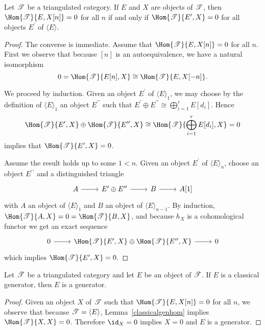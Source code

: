 \documentclass[10pt]{amsart}
\begin{document}
\begin{lem}\label{classicalgenhom}
  Let $\mathscr{T}$ be a triangulated category.
  If $E$ and $X$ are objects of $\mathscr{T}$, then $\Hom{\T}{E,X[n]} = 0$ for all $n$ if and only if $\Hom{\T}{E^\prime, X} = 0$ for all objects $E^\prime$ of $\langle E \rangle$.
  
  \begin{proof}
    The converse is immediate.
    Assume that $\Hom{\T}{E,X[n]} = 0$ for all $n$.
    First we observe that because $[n]$ is an autoequivalence, we have a natural isomorphism
    $$0 = \Hom{\T}{E[n], X} \cong \Hom{\T}{E, X[-n]}.$$
    
    We proceed by induction.
    Given an object $E^\prime$ of $\langle E \rangle_1$, we may choose by the definition of $\langle E \rangle_1$ an object  $E^{\prime\prime}$ such that $E^\prime \oplus E^{\prime\prime} \cong \bigoplus_{i = 1}^r E[d_i]$.
    Hence
    $$\Hom{\T}{E^\prime,X} \oplus \Hom{\T}{E^{\prime\prime}, X} \cong \Hom{\T}{\bigoplus_{i=1}^rE[d_i], X} = 0$$
    implies that $\Hom{\T}{E^\prime, X} = 0$.
    
    Assume the result holds up to some $1 < n$.
    Given an object $E^\prime$ of $\langle E \rangle_n$, choose an object $E^{\prime\prime}$ and a distinguished triangle
    $$\begin{tikzcd}
      A \arrow{r} & E^\prime \oplus E^{\prime\prime} \arrow{r} & B \arrow{r} & A[1]
    \end{tikzcd}$$
    with $A$ an object of $\langle E \rangle_1$ and $B$ an object of $\langle E \rangle_{n-1}$.
    By induction, $\Hom{\T}{A,X} = 0 = \Hom{\T}{B,X}$, and because $h_X$ is a cohomological functor we get an exact sequence
    $$\begin{tikzcd}
      0 \arrow{r} & \Hom{\T}{E^\prime,X} \oplus \Hom{\T}{E^{\prime\prime}, X} \arrow{r} & 0
    \end{tikzcd}$$
    which implies $\Hom{\T}{E^\prime,X} = 0$.
  \end{proof}
\end{lem}

\begin{lem}\label{classicalgenisgen}
  Let $\mathscr{T}$ be a triangulated category and let $E$ be an object of $\mathscr{T}$.
  If $E$ is a classical generator, then $E$ is a generator.
  
  \begin{proof}
    Given an object $X$ of $\mathscr{T}$ such that $\Hom{\T}{E,X[n]} = 0$ for all $n$, we observe that because $\mathscr{T} = \langle E \rangle$, Lemma~\ref{classicalgenhom} implies $\Hom{\T}{X,X} = 0$.
    Therefore $\id_{X} = 0$ implies $X = 0$ and $E$ is a generator.
  \end{proof}
\end{lem}
\end{document}
